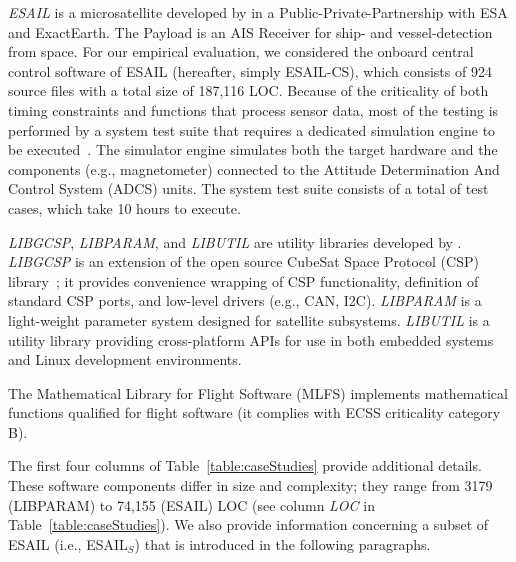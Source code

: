 \emph{ESAIL} is a microsatellite developed by \LXS{}  in a Public-Private-Partnership with ESA and ExactEarth. The Payload is an AIS Receiver for ship- and vessel-detection from space. 
For our empirical evaluation, we considered the onboard central control software of ESAIL (hereafter, simply ESAIL-CS), which consists of 924 source files with a total size of 187,116 LOC. Because of the criticality of both timing constraints and functions that process sensor data, most of the testing is performed by a system test suite that requires a dedicated simulation engine to be executed~\cite{Isasi2019}. The simulator engine  simulates both the target hardware and the components (e.g., magnetometer) connected to the Attitude Determination And Control System (ADCS) units.
The system test suite consists of a total of  test cases, which take 10 hours to execute.

\emph{LIBGCSP}, \emph{LIBPARAM}, and \emph{LIBUTIL}  are utility libraries developed by \GSL.
\emph{LIBGCSP} is an extension of the open source CubeSat Space Protocol (CSP) library~\cite{CSP}; it provides convenience wrapping of CSP functionality,
definition of standard CSP ports, and low-level drivers (e.g., CAN, I2C).
\emph{LIBPARAM} is a light-weight parameter system designed for \GSL satellite subsystems. 
\emph{LIBUTIL} is a utility library providing cross-platform APIs for use in both embedded systems and Linux development environments.

 
The Mathematical Library for Flight Software
(MLFS)
implements mathematical functions qualified for flight software (it complies with ECSS criticality category B).
 
The first four columns of Table~\ref{table:caseStudies} provide additional details.  
These software components differ in size and complexity; they range from 3179 (LIBPARAM) to 74,155 (ESAIL) LOC (see column \emph{LOC} in Table~\ref{table:caseStudies}). We also provide information concerning a subset of ESAIL (i.e., ESAIL$_S$) that is introduced in the following paragraphs.

